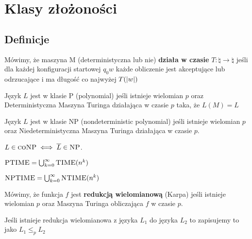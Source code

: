 \section{Klasy złożoności}

\subsection{Definicje}

\begin{definition}
    Mówimy, że maszyna M (deterministyczna lub nie) \textbf{działa w czasie} \( T : \natural \rightarrow \natural \) jeśli dla każdej konfiguracji startowej \( q_0 w \) każde obliczenie jest akceptujące lub odrzucające i ma długość co najwyżej \( T(\left\lvert w\right\rvert) \)
\end{definition}

\begin{definition}
    Język \( L \) jest w klasie P (polynomial) jeśli istnieje wielomian \( p \)
    oraz Deterministyczna Maszyna Turinga działająca w czasie \( p \) taka, że \( L(M) = L \)
\end{definition}

\begin{definition}
    Język \( L \) jest w klasie NP (nondeterministic polynomial) jeśli istnieje wielomian \( p \) oraz Niedeterministyczna Maszyna Turinga działająca w czasie \( p \).
\end{definition}

\begin{definition}
     \(  L \in  \textsc{coNP} \iff \overline{L} \in \textsc{NP} \).
\end{definition}

\begin{definition}
    \( \textsc{PTIME} = \bigcup_{k=0}^\infty \textsc{TIME}(n^k) \)
\end{definition}

\begin{definition}
    \( \textsc{NPTIME} = \bigcup_{k=0}^\infty \textsc{NTIME}(n^k) \)
\end{definition}


\begin{definition}
    Mówimy, że funkcja \( f \) jest \textbf{redukcją wielomianową} (Karpa) jeśli istnieje wielomian \( p \) oraz Maszyna Turinga obliczająca \( f \) w czasie \( p \). 
    
    Jeśli istnieje redukcja wielomianowa z języka \( L_1 \) do języka \( L_2 \) to zapisujemy to jako \( L_1 \leq_p L_2 \)
\end{definition}

